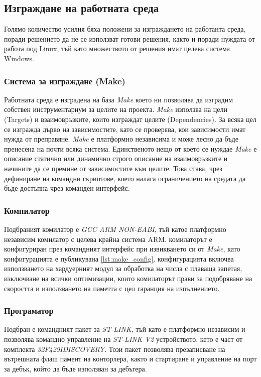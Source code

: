 \subsection{Изграждане на работната среда}

Голямо количество усилия бяха положени за изграждането на работанта среда, поради решението да не се използват готови решения,
както и поради нуждата от работа под Linux, тъй като множеството от решения имат целева система Windows.

\subsubsection{Система за изграждане (Make)}

Работната среда е изградена на база \textit{Make} което ни позволява да изградим собствен инструментариум за целите на проекта.
\textit{Make} използва на цели (Targets) и взаимовръзките, които изграждат целите (Dependencies). За всяка цел се изгражда дърво
на зависимостите, като се проверява,
кои зависимости имат нужда от преправяне. \textit{Make} е платформно независима и може лесно да бъде пренесена на почти всяка система.
Единственото нещо от което се нуждае \textit{Make} е описание статично или динамично строго описание на взаимовръзките и начините да се
премине от зависимостите към целите. Това става, чрез дефиниране на командни скриптове, което налага ограничението на средата да бъде
достъпна чрез команден интерфейс.

\subsubsection{Компилатор}

Подбраният комилатор е \textit{GCC ARM NON-EABI}, тъй катое платформно независим комилатор с целева крайна система ARM.
комилаторът е конфигуриран през командният интерфейс при извикването си от \textit{Make},
като конфигурацията е публикувана \autoref{lst:make_config}.
конфигурацията включва използването на хардуерният модул за обработка на числа с плаваща запетая,
изключване на всички оптимизации, които комилаторът прави за подобряване на скоростта и използването на паметта с цел гаранция на изпълнението.

\subsubsection{Програматор}

Подбран е командният пакет за \textit{ST-LINK}, тъй като е платформно независим и позволява командно управление на \textit{ST-LINK V2} устройството,
кето е част от комплекта \textit{32F429IDISCOVERY}. Този пакет позволява презаписване на вътрешната флаш памент на конторлера,
както и стартиране и управление на порт за дебък, който да бъде използван за дебъгера.


